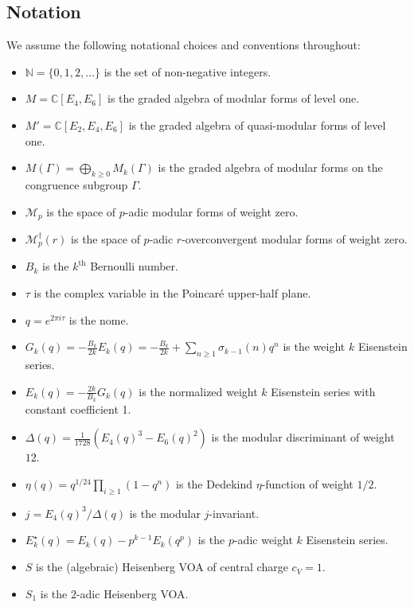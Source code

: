 \documentclass[10pt,a4paper]{amsart}
\numberwithin{equation}{section}
\theoremstyle{definition}
\newcommand{\Heis}{S}
\newcommand{\pHeis}{S_{1}}
\newcommand{\pmodforms}{\mathcal{M}_{p}}
\newcommand{\poverconv}[1]{\pmodforms^{\dagger} (#1)}
\begin{document}
\subsection{Notation} We assume the following notational choices and conventions throughout:
\begin{itemize}
    \item $\mathbb{N} = \lbrace 0,1,2, \ldots \rbrace$ is the set of non-negative integers.
    \item $M = \mathbb{C}[E_{4},E_{6}]$ is the graded algebra of modular forms of level one. 
    \item $M' = \mathbb{C}[E_{2},E_{4},E_{6}]$ is the graded algebra of quasi-modular forms of level one.
    \item $M(\Gamma) = \bigoplus_{k \geq 0} M_{k}(\Gamma)$ is the graded algebra of modular forms on the congruence subgroup $\Gamma$. 
    \item $\pmodforms$ is the space of $p$-adic modular forms of weight zero. 
    \item $\poverconv{r}$ is the space of $p$-adic $r$-overconvergent modular forms of weight zero.
    \item $B_{k}$ is the $k^{\text{th}}$ Bernoulli number. 
    \item $\tau$ is the complex variable in the Poincar\'e upper-half plane.
    \item $q = e^{2 \pi i \tau}$ is the nome.
    \item $G_{k}(q) = -\frac{B_{k}}{2k}E_{k}(q) = - \frac{B_{k}}{2k} + \sum_{n \geq 1} \sigma_{k-1}(n)q^{n}$ is the weight $k$ Eisenstein series. 
    \item $E_{k}(q) = - \frac{2k}{B_{k}}G_{k}(q)$ is the normalized weight $k$ Eisenstein series with constant coefficient 1.
    \item $\Delta (q) = \frac{1}{1728} ( E_{4}(q)^{3} - E_{6}(q)^{2})$ is the modular discriminant of weight $12$.
    \item $\eta (q) = q^{1/24} \prod_{i \geq 1} (1-q^{n})$ is the Dedekind $\eta$-function of weight $1/2$.
    \item $j = E_{4}(q)^{3} / \Delta (q)$ is the modular $j$-invariant.
    \item $E_{k}^{\star}(q) = E_{k}(q) - p^{k-1} E_{k}(q^{p})$ is the $p$-adic weight $k$ Eisenstein series.
    \item $\Heis$ is the (algebraic) Heisenberg VOA of central charge $c_{V} = 1$.
    \item $\pHeis$ is the $2$-adic Heisenberg VOA.
\end{itemize}
\end{document}
